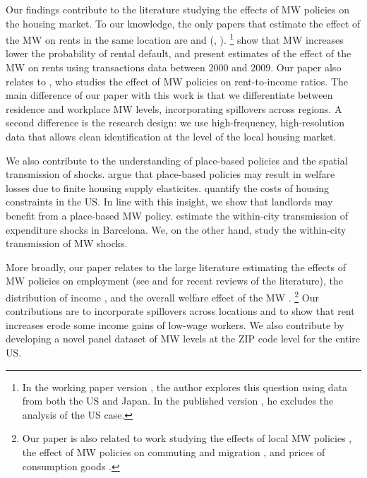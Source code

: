 
Our findings contribute to the literature studying the effects of MW policies 
on the housing market.
To our knowledge, the only papers that estimate the effect of the MW on rents 
in the same location are \textcite{Tidemann2018} and \citeauthor{Yamagishi2019} 
(\cite*{Yamagishi2019}, \cite*{Yamagishi2021}).%
\footnote{In the working paper version \parencite{Yamagishi2019}, the author 
	explores this question using data from both the US and Japan.
	In the published version \parencite{Yamagishi2021}, he excludes the analysis 
	of the US case.}
\textcite{AgarwalEtAl2021} show that MW increases lower the probability of 
rental default, and present estimates of the effect of the MW on rents using 
transactions data between 2000 and 2009.
Our paper also relates to \textcite{Hughes2020}, who studies the effect of 
MW policies on rent-to-income ratios.
The main difference of our paper with this work is that we differentiate 
between residence and workplace MW levels, incorporating spillovers across 
regions.
A second difference is the research design: we use high-frequency,
high-resolution data that allows clean identification at the level of the 
local housing market.

We also contribute to the understanding of place-based policies and the spatial 
transmission of shocks.
\textcite{KlineMoretti2014} argue that place-based policies may result in 
welfare losses due to finite housing supply elasticites.
\textcite{HsiehMoretti2019} quantify the costs of housing constraints in the US.
In line with this insight, we show that landlords may benefit from a place-based 
MW policy.
\textcite{AllenEtAl2020} estimate the within-city transmission of expenditure 
shocks in Barcelona.
We, on the other hand, study the within-city transmission of MW shocks.

More broadly, our paper relates to the large literature estimating the effects
of MW policies on employment
(see \cite{Dube2019} and \cite{NeumarkShirley2021} for recent reviews of the 
literature), 
the distribution of income \parencite[e.g.,][]{Lee1999, AutorEtAl2016, 
	Dube2019Income}, 
and the overall welfare effect of the MW \parencite{AhlfeldtEtAl2022,
	BergerHerkenhoffMongey2022}.%
\footnote{Our paper is also related to work studying 
	the effects of local MW policies 
	\parencite[e.g.,][]{DubeLindner2021, JardimEtAl2022seattle}, 
	the effect of MW policies on commuting and migration 
	\parencite[e.g.,]{Cadena2014, Monras2019, PerezPerez2021}, 
	and prices of consumption goods 
	\parencite[e.g.,]{AllegrettoReich2018, Leung2021}.}
Our contributions are to incorporate spillovers across locations 
\parencite[as in the recent work by][]{JardimEtAl2022discontinuity} and to show 
that rent increases erode some income gains of low-wage workers.
We also contribute by developing a novel panel dataset of MW levels at the 
ZIP code level for the entire US.

